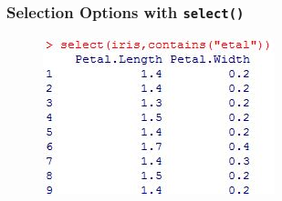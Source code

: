 \documentclass{beamer}
\begin{document}
\begin{frame}
	\frametitle{Selection Options with \texttt{select()}}
	
	\begin{figure}
		\centering
		\includegraphics[width=0.69\linewidth]{images/selectioncontaints}
	\end{figure}
	
\end{frame}
\end{document}
